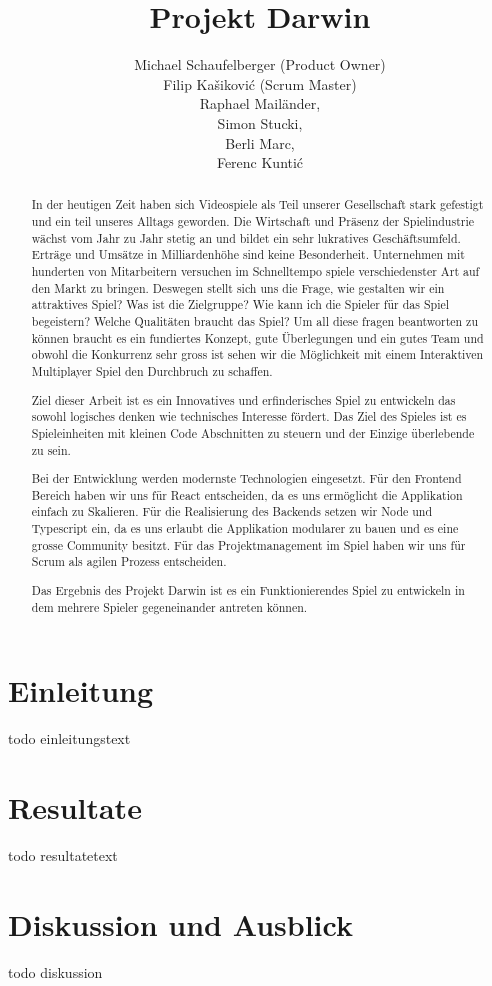 \documentclass[11pt,a4paper,titlepage]{article}
\author{Michael Schaufelberger (Product Owner)\\
Filip Kašiković (Scrum Master)\\
Raphael Mailänder,\\
Simon Stucki,\\
Berli Marc,\\
Ferenc Kuntić}
\title{Projekt Darwin}
\begin{document}
\maketitle


\begin{abstract}

In der heutigen Zeit haben sich Videospiele als Teil unserer Gesellschaft stark gefestigt und ein teil unseres Alltags geworden. Die Wirtschaft und Präsenz der Spielindustrie wächst vom Jahr zu Jahr stetig an und bildet ein sehr lukratives Geschäftsumfeld. Erträge und Umsätze in Milliardenhöhe sind keine Besonderheit. Unternehmen mit hunderten von Mitarbeitern versuchen im Schnelltempo spiele verschiedenster Art auf den Markt zu bringen. 
Deswegen stellt sich uns die Frage, wie gestalten wir ein attraktives Spiel? Was ist die Zielgruppe? Wie kann ich die Spieler für das Spiel begeistern? Welche Qualitäten braucht das Spiel?
Um all diese fragen beantworten zu können braucht es ein fundiertes Konzept, gute Überlegungen und ein gutes Team und obwohl die Konkurrenz sehr gross ist sehen wir die Möglichkeit mit einem Interaktiven Multiplayer Spiel den Durchbruch zu schaffen.

Ziel dieser Arbeit ist es ein Innovatives und erfinderisches Spiel zu entwickeln das sowohl logisches denken wie technisches Interesse fördert. Das Ziel des Spieles ist es Spieleinheiten mit kleinen Code Abschnitten zu steuern und der Einzige überlebende zu sein.

Bei der Entwicklung werden modernste Technologien eingesetzt. Für den Frontend Bereich haben wir uns für React entscheiden, da es uns ermöglicht die Applikation einfach zu Skalieren. Für die Realisierung des Backends setzen wir Node und Typescript ein, da es uns erlaubt die Applikation modularer zu bauen und es eine grosse Community besitzt.
Für das Projektmanagement im Spiel haben wir uns für Scrum als agilen Prozess entscheiden.

Das Ergebnis des Projekt Darwin ist es ein Funktionierendes Spiel zu entwickeln in dem mehrere Spieler gegeneinander antreten können.

\end{abstract}

\tableofcontents

\section{Einleitung}
todo einleitungstext

\section{Resultate}
todo resultatetext

\section{Diskussion und Ausblick}
todo diskussion
\end{document}
